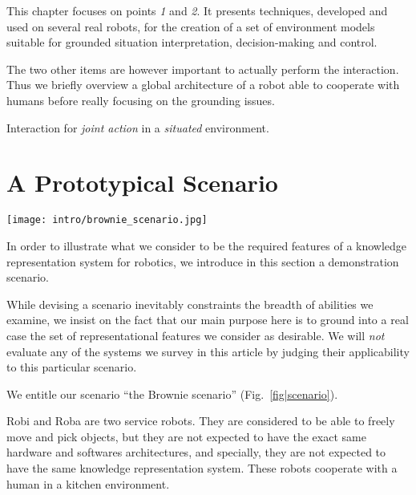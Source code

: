 This chapter focuses on points {\it 1} and {\it 2}. It presents techniques,
developed and used on several real robots, for the creation of a set of
environment models suitable for grounded situation interpretation,
decision-making and control.

The two other items are however important to actually perform the interaction.
Thus we briefly overview a global architecture of a robot able to cooperate
with humans before really focusing on the grounding issues.




Interaction for \emph{joint action} in a \emph{situated} environment.


\section{A Prototypical Scenario}
\label{sect|scenario}

\begin{figure*}
	\centering
	\texttt{[image: intro/brownie\_scenario.jpg]}
	\caption{A representation of the scenario, in the MORSE simulator}
	\label{fig|scenario}
\end{figure*}

In order to illustrate what we consider to be the required features of a
knowledge representation system for robotics, we introduce in this section a
demonstration scenario.

While devising a scenario inevitably constraints the breadth of abilities we
examine, we insist on the fact that our main purpose here is to ground into a
real case the set of representational features we consider as desirable.  We
will \emph{not} evaluate any of the systems we survey in this article by
judging their applicability to this particular scenario.

We entitle our scenario ``the Brownie scenario'' (Fig.~\ref{fig|scenario}).

Robi and Roba are two service robots. They are considered to be able to freely
move and pick objects, but they are not expected to have the exact same
hardware and softwares architectures, and specially, they are not expected to
have the same knowledge representation system. These robots cooperate with a
human in a kitchen environment.

